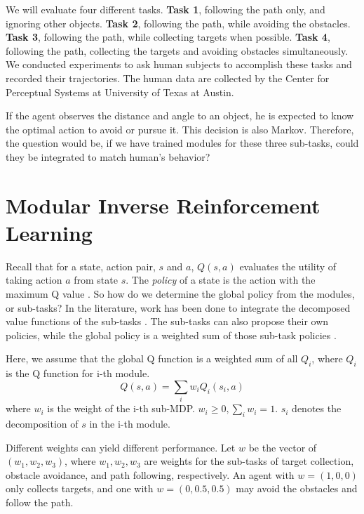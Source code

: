 \documentclass[11pt]{article} %
\begin{document}
We will evaluate four different tasks. {\bf Task 1}, following the path only, and
ignoring other objects. {\bf Task 2}, following the path, while avoiding the obstacles.
{\bf Task 3}, following the path, while collecting targets when possible. {\bf Task 4},
following the path, collecting the targets and avoiding obstacles
simultaneously.
We conducted experiments to ask human subjects to accomplish these tasks and
recorded their trajectories. The human data are collected by the Center for
Perceptual Systems at University of Texas at Austin.

If the agent observes the distance and angle to an object, he is expected to
know the optimal action to avoid or pursue it. This decision is also Markov.
Therefore, the question would be, if we have trained modules for these three
sub-tasks, could they be integrated to match human's behavior?

\section{Modular Inverse Reinforcement Learning}
\label{sec:rl}

Recall that for a state, action
pair, $s$ and $a$, $Q(s, a)$ evaluates the utility of taking action $a$ from
state $s$. The {\em policy} of a state is the action with the maximum Q
value \cite{rl}. So how do we determine the global policy from the modules, or
sub-tasks? In the literature, work has been done to integrate the decomposed
value functions of the sub-tasks \cite{koller1999computing}. The sub-tasks can
also propose their own policies, while the global policy is a weighted sum of
those sub-task policies \cite{thomas2012motor}.

Here, we assume that the global Q function is a weighted sum of all $Q_i$, where
$Q_i$ is the Q function for i-th module.
$$Q(s, a) = \sum_i w_i Q_i (s_i, a)$$
where $w_i$ is the weight of the i-th sub-MDP. $w_i \geq 0, \sum_i w_i = 1$.
$s_i$ denotes the decomposition of $s$ in the i-th module.

Different weights can yield different performance. Let $w$ be the vector of
$(w_1, w_2, w_3)$, where $w_1, w_2, w_3$ are weights for the sub-tasks of target
collection, obstacle avoidance, and path following, respectively. An agent with
$w = (1, 0, 0)$ only collects targets, and one with $w = (0, 0.5, 0.5)$ may
avoid the obstacles and follow the path.
\end{document}
